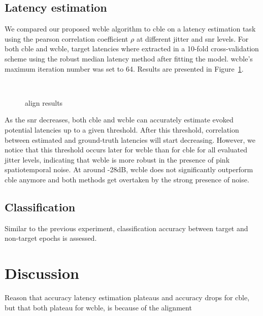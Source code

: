 \subsection{Latency estimation}
We compared our proposed \ac{wcble} algorithm to \ac{cble} on a latency
estimation task using the pearson correlation coefficient $\rho$ at different
jitter and \ac{snr} levels.
For both \ac{cble} and \ac{wcble}, target latencies where extracted in a
10-fold cross-validation scheme using the robust median latency method after
fitting the model.
\Ac{wcble}'s maximum iteration number was set to 64.
Results are presented in Figure~\ref{fig:wcble/results/latency}.

\begin{figure}
  \sansmath
   \\
  
  \caption{align results}
  \label{fig:wcble/results/latency}
\end{figure}

As the \ac{snr} decreases, both \ac{cble} and \ac{wcble} can accurately
estimate evoked potential latencies up to a given threshold. After this
threshold, correlation between estimated and ground-truth latencies will start
decreasing.
However, we notice that this threshold occurs later for \ac{wcble} than for
\ac{cble} for all evaluated jitter levels, indicating that \ac{wcble} is more
robust in the presence of pink spatiotemporal noise.
At around -28dB, \ac{wcble} does not significantly outperform \ac{cble}
anymore and both methods get overtaken by the strong presence of noise.


\subsection{Classification}
Similar to the previous experiment, classification accuracy between target and
non-target epochs is assessed.


\section{Discussion}

Reason that accuracy latency estimation plateaus and accuracy drops for cble,
but that both plateau for wcble, is because of the alignment


